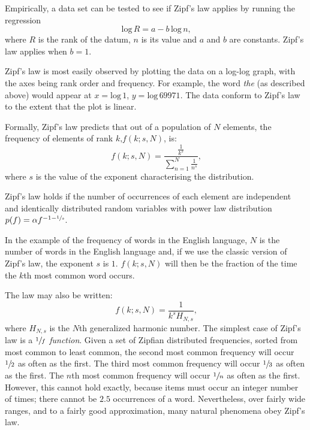       Empirically, a data set can be tested to see if Zipf's law applies by running the regression
      \begin{equation}
        \mbox{log}\,R = a - b\,\mbox{log}\,n \mbox{,}
      \end{equation}
      where $R$ is the rank of the datum, $n$ is its value and $a$ and $b$ are constants. Zipf's law applies when $b = 1$. 
      
      Zipf's law is most easily observed by plotting the data on a log-log graph, with the axes being rank order and frequency. For example, the word \emph{the} (as described above) would appear at $x = \mbox{log}\,1$, $y = \mbox{log}\,69971$. The data conform to Zipf's law to the extent that the plot is linear.
      
      Formally, Zipf's law predicts that out of a population of $N$ elements, the frequency of elements of rank $k\mbox{,} f(k; s, N)$, is:
      \begin{equation}
        f(k;s,N)=\frac{\frac{1}{k^s}}{\sum\limits_{n=1}^N \frac{1}{n^s}}\mbox{,}
      \end{equation}
      where $s$ is the value of the exponent characterising the distribution.

      Zipf's law holds if the number of occurrences of each element are independent and identically distributed random variables with power law distribution $p(f) = \alpha f^{-1-\sfrac{1}{s}}$\cite{AdamicHuberman2002}.

      In the example of the frequency of words in the English language, $N$ is the number of words in the English language and, if we use the classic version of Zipf's law, the exponent $s$ is $1$. $f(k; s, N)$ will then be the fraction of the time the $k$th most common word occurs.

      The law may also be written:
      \begin{equation}
        f(k; s, N)=\frac{1}{k^s H_{N, s}}\mbox{,}
      \end{equation}
      where $H_{N,s}$ is the $N$th generalized harmonic number.
The simplest case of Zipf's law is a \emph{$\sfrac{1}{f}$ function}. Given a set of Zipfian distributed frequencies, sorted from most common to least common, the second most common frequency will occur $\sfrac{1}{2}$ as often as the first. The third most common frequency will occur $\sfrac{1}{3}$ as often as the first. The $n$th most common frequency will occur $\sfrac{1}{n}$ as often as the first. However, this cannot hold exactly, because items must occur an integer number of times; there cannot be $2.5$ occurrences of a word. Nevertheless, over fairly wide ranges, and to a fairly good approximation, many natural phenomena obey Zipf's law.
  

